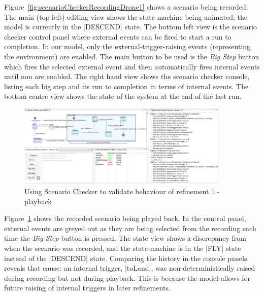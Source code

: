 Figure~\ref{fig:scenarioCheckerRecordingDrone1} shows a scenario being recorded.
The main (top-left) editing view shows the state-machine being animated; the model is currently in the |DESCEND| state.
The bottom left view is the scenario checker control panel where external events can be fired to start a run to completion.
In our model, only the external-trigger-raising events (representing the environment) are enabled.
The main button to be used is the \emph{Big Step} button which fires the selected external event and then automatically fires internal events until non are enabled.
The right hand view shows the scenario checker console, listing each big step and its run to completion in terms of internal events.
The bottom centre view shows the state of the system at the end of the last run.

\begin{figure}[!th]
	\centering
	\includegraphics[width=0.90\textwidth, trim=30 50 60 0]{figures/scenarioChecker_playback_drone1.png}
	\caption{Using Scenario Checker to validate behaviour of refinement 1 - playback }
	\label{fig:scenarioCheckerPlaybackDrone1}
\end{figure}

Figure~\ref{fig:scenarioCheckerPlaybackDrone1} shows the recorded scenario being played back.
In the control panel, external events are greyed out as they are being selected from the recording each time the \emph{Big Step} button is pressed. 
The state view shows a discrepancy from when the scenario was recorded, and the state-machine is in the |FLY| state instead of the |DESCEND| state.
Comparing the history in the console panels reveals that cause: an internal trigger, |toLand|, was non-deterministically raised during recording but not during playback.
This is because the model allows for future raising of internal triggers in later refinements.

